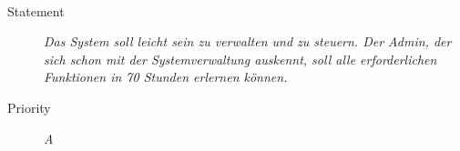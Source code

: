 \paragraph{}
\begin{description}
\item[Statement] \textit{Das System soll leicht sein zu verwalten und zu steuern. Der Admin, der sich schon mit der Systemverwaltung auskennt, soll alle erforderlichen Funktionen in 70 Stunden erlernen können.}
\item[Priority] \textit{A}
\end{description}

